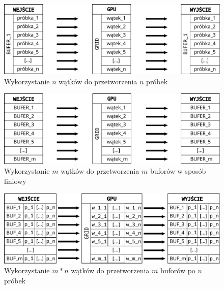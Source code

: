 \begin{figure}
    \centering
    \includegraphics[width=\textwidth]{./fig/przetwarzanie_1_do_1.pdf}
    \caption{Wykorzystanie $n$ wątków do przetworzenia $n$ próbek}
    \label{fig:Wykorzystanie n wątków do przetworzenia n próbek}
\end{figure}

\begin{figure}
    \centering
    \includegraphics[width=\textwidth]{./fig/przetwarzanie_m_do_1.pdf}
    \caption{Wykorzystanie $m$ wątków do przetworzenia $m$ buforów w sposób liniowy}
    \label{fig:Wykorzystanie m wątków do przetworzenia m buforów}
\end{figure}

\begin{figure}
    \centering
    \includegraphics[width=\textwidth]{./fig/przetwarzanie_m_do_m.pdf}
    \caption{Wykorzystanie $m*n$ wątków do przetworzenia $m$ buforów po $n$ próbek}
    \label{fig:Wykorzystanie m*n wątków do przetworzenia m buforów po n próbek}
\end{figure}